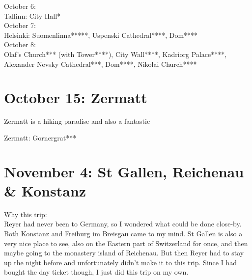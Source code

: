 October 6:\\
Tallinn: City Hall*\\

October 7:\\
Helsinki: Suomenlinna*****, Uspenski Cathedral****, Dom****\\

October 8:\\
Olaf's Church*** (with Tower****), City Wall****, Kadriorg Palace****, Alexander Nevsky Cathedral***, Dom****, Nikolai Church****

\section{October 15: Zermatt}
\label{Zermatt2017}

Zermatt is a hiking paradise and also a fantastic 

Zermatt: Gornergrat***

\section{November 4: St Gallen, Reichenau \& Konstanz}
\label{StGallen2017}

Why this trip:\\
Reyer had never been to Germany, so I wondered what could be done close-by. Both Konstanz and Freiburg im Breisgau came to my mind. St Gallen is also a very nice place to see, also on the Eastern part of Switzerland for once, and then maybe going to the monastery island of Reichenau. But then Reyer had to stay up the night before and unfortunately didn't make it to this trip. Since I had bought the day ticket though, I just did this trip on my own.\\

